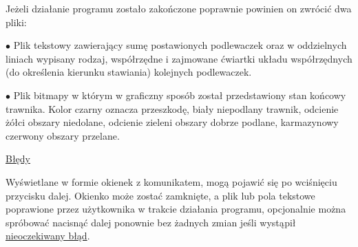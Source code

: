 \documentclass[12pt]{article}
\renewcommand{\_}{\kern-1.5pt\textunderscore\kern-1.5pt}
\begin{document}
\setlength{\parskip}{5.04pt}
Jeżeli działanie programu zostało zakończone poprawnie powinien on zwrócić dwa pliki:\par

$\bullet$  Plik tekstowy zawierający sumę postawionych podlewaczek oraz w oddzielnych liniach wypisany rodzaj, współrzędne i zajmowane ćwiartki układu współrzędnych (do określenia kierunku stawiania) kolejnych podlewaczek.\par

$\bullet$  Plik bitmapy w którym w graficzny sposób został przedstawiony stan końcowy trawnika. Kolor czarny oznacza przeszkodę, biały niepodlany trawnik, odcienie żółci obszary niedolane, odcienie zieleni obszary dobrze podlane, karmazynowy czerwony obszary przelane.\par


\vspace{\baselineskip}
\setlength{\parskip}{8.04pt}
{\fontsize{16pt}{19.2pt}\selectfont \uline{Błędy }\par}\par

\setlength{\parskip}{3.0pt}
Wyświetlane w formie okienek z komunikatem, mogą pojawić się po wciśnięciu przycisku dalej. Okienko może zostać zamknięte, a plik lub pola tekstowe poprawione przez użytkownika w trakcie działania programu, opcjonalnie można spróbować nacisnąć dalej ponownie bez żadnych zmian jeśli wystąpił \uline{nieoczekiwany błąd}.\par
\end{document}
